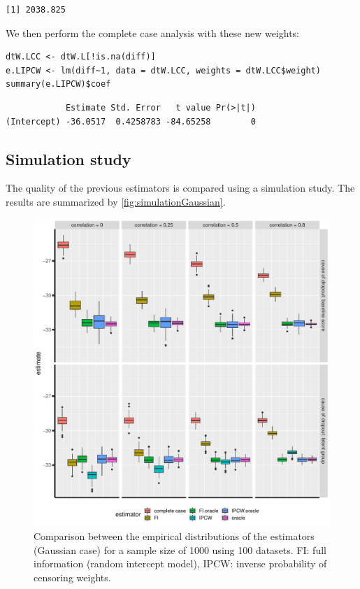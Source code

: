 \documentclass[12pt]{article}
\begin{document}
\begin{verbatim}
[1] 2038.825
\end{verbatim}


We then perform the complete case analysis with these new weights:
\lstset{language=r,label= ,caption= ,captionpos=b,numbers=none}
\begin{lstlisting}
dtW.LCC <- dtW.L[!is.na(diff)]
e.LIPCW <- lm(diff~1, data = dtW.LCC, weights = dtW.LCC$weight)
summary(e.LIPCW)$coef
\end{lstlisting}

\begin{verbatim}
            Estimate Std. Error   t value Pr(>|t|)
(Intercept) -36.0517  0.4258783 -84.65258        0
\end{verbatim}


\clearpage

\subsection{Simulation study}
\label{sec:org2995e26}

The quality of the previous estimators is compared using a simulation
study. The results are summarized by \autoref{fig:simulationGaussian}.

\begin{figure}[!h]
\centering
\includegraphics[width=\textwidth]{./figures/simStudy-bias.pdf}
\caption{\label{fig:simulationGaussian}Comparison between the empirical distributions of the estimators (Gaussian case) for a sample size of 1000 using 100 datasets. FI: full information (random intercept model), IPCW: inverse probability of censoring weights.}
\end{figure}
\end{document}
